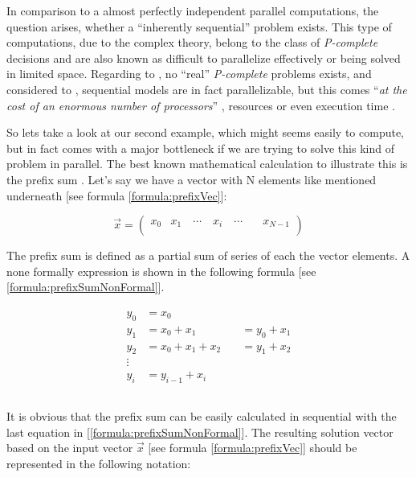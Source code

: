 \noindent In comparison to a almost perfectly independent parallel computations, the question arises, whether a ``inherently sequential'' problem exists. This type of computations, due to the complex theory, belong to the class of \textit{P-complete} \parencite{inbook1} decisions and are also known as difficult to parallelize effectively or being solved in limited space. Regarding to \parencite{inbook1}, no ``real'' \textit{P-complete} problems exists, and considered to \parencite{book8}, sequential models are in fact parallelizable, but this comes ``\textit{at the cost of an enormous number of processors}'' \parencite[see][Chapter 5.5, p69]{book8}, resources or even execution time \parencite[see][p61]{book8}.

So lets take a look at our second example, which might seems easily to compute, but in fact comes with a major bottleneck if we are trying to solve this kind of problem in parallel. The best known mathematical calculation to illustrate this is the prefix sum \parencite{article7}. Let's say we have a vector with N elements like mentioned underneath [see formula \ref{formula:prefixVec}]:

\begin{equation} \label{formula:prefixVec}
\vec{x} = \begin{pmatrix}
	x_{0} & x_{1} \quad \cdots \quad x_{i} \quad \cdots \quad & x_{N - 1} \\
\end{pmatrix}
\end{equation}

\newpage

The prefix sum is defined as a partial sum of series of each the vector elements. A none formally expression is shown in the following formula [see \ref{formula:prefixSumNonFormal}].

\begin{align} \label{formula:prefixSumNonFormal}
	\begin{aligned}
	y_0 &= x_0 \\
	y_1 &= x_0 + x_1 \quad &= y_0 + x_1 \\
	y_2 &= x_0 + x_1 + x_2 \quad &= y_1 + x_2 \\
	\vdots \\
	y_i &= y_{i - 1} + x_i \\
	\end{aligned}
\end{align}
\\[2pt]
It is obvious that the prefix sum can be easily calculated in sequential with the last equation in [\ref{formula:prefixSumNonFormal}]. The resulting solution vector based on the input vector $\vec{x}$ [see formula \ref{formula:prefixVec}] should be represented in the following notation:\\

